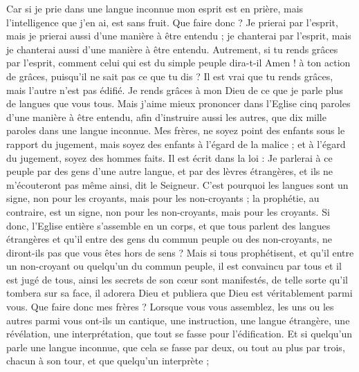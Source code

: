\begin{multicols}{2}
Car si je prie dans une langue inconnue mon esprit est en prière, mais l'intelligence que j'en ai, est sans fruit.
Que faire donc ? Je prierai par l'esprit, mais je prierai aussi d'une manière à être entendu ; je chanterai par l'esprit, mais je chanterai aussi d'une manière à être entendu.
Autrement, si tu rends grâces par l'esprit, comment celui qui est du simple peuple dira-t-il Amen ! à ton action de grâces, puisqu'il ne sait pas ce que tu dis ?
Il est vrai que tu rends grâces, mais l'autre n'est pas édifié.
Je rends grâces à mon Dieu de ce que je parle plus de langues que vous tous.
Mais j'aime mieux prononcer dans l'Eglise cinq paroles d'une manière à être entendu, afin d'instruire aussi les autres, que dix mille paroles dans une langue inconnue.
Mes frères, ne soyez point des enfants sous le rapport du jugement, mais soyez des enfants à l'égard de la malice ; et à l'égard du jugement, soyez des hommes faits.
Il est écrit dans la loi : Je parlerai à ce peuple par des gens d'une autre langue, et par des lèvres étrangères, et ils ne m'écouteront pas même ainsi, dit le Seigneur.
C'est pourquoi les langues sont un signe, non pour les croyants, mais pour les non-croyants ; la prophétie, au contraire, est un signe, non pour les non-croyants, mais pour les croyants.
Si donc, l'Eglise entière s'assemble en un corps, et que tous parlent des langues étrangères et qu'il entre des gens du commun peuple ou des non-croyants, ne diront-ils pas que vous êtes hors de sens ?
Mais si tous prophétisent, et qu'il entre un non-croyant ou quelqu'un du commun peuple, il est convaincu par tous et il est jugé de tous,
ainsi les secrets de son cœur sont manifestés, de telle sorte qu'il tombera sur sa face, il adorera Dieu et publiera que Dieu est véritablement parmi vous.
Que faire donc mes frères ? Lorsque vous vous assemblez, les uns ou les autres parmi vous ont-ils un cantique, une instruction, une langue étrangère, une révélation, une interprétation, que tout se fasse pour l'édification.
Et si quelqu'un parle une langue inconnue, que cela se fasse par deux, ou tout au plus par trois, chacun à son tour, et que quelqu'un interprète ;

\end{multicols}
